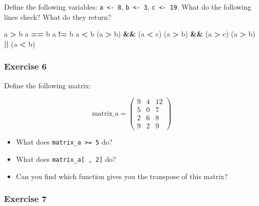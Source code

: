 \documentclass[
]{article}
\newenvironment{Shaded}{\begin{snugshade}}{\end{snugshade}}
\newcommand{\NormalTok}[1]{#1}
\newcommand{\OperatorTok}[1]{\textcolor[rgb]{0.81,0.36,0.00}{\textbf{#1}}}
\newcommand{\StringTok}[1]{\textcolor[rgb]{0.31,0.60,0.02}{#1}}
\providecommand{\tightlist}{%
  \setlength{\itemsep}{0pt}\setlength{\parskip}{0pt}}
\begin{document}
Define the following variables: \texttt{a\ \textless{}-\ 8}, \texttt{b\ \textless{}-\ 3}, \texttt{c\ \textless{}-\ 19}. What do the following lines check?
What do they return?

\begin{Shaded}
\begin{Highlighting}[]
\NormalTok{a }\OperatorTok{\textgreater{}}\StringTok{ }\NormalTok{b}
\NormalTok{a }\OperatorTok{==}\StringTok{ }\NormalTok{b}
\NormalTok{a }\OperatorTok{!=}\StringTok{ }\NormalTok{b}
\NormalTok{a }\OperatorTok{\textless{}}\StringTok{ }\NormalTok{b}
\NormalTok{(a }\OperatorTok{\textgreater{}}\StringTok{ }\NormalTok{b) }\OperatorTok{\&\&}\StringTok{ }\NormalTok{(a }\OperatorTok{\textless{}}\StringTok{ }\NormalTok{c)}
\NormalTok{(a }\OperatorTok{\textgreater{}}\StringTok{ }\NormalTok{b) }\OperatorTok{\&\&}\StringTok{ }\NormalTok{(a }\OperatorTok{\textgreater{}}\StringTok{ }\NormalTok{c)}
\NormalTok{(a }\OperatorTok{\textgreater{}}\StringTok{ }\NormalTok{b) }\OperatorTok{||}\StringTok{ }\NormalTok{(a }\OperatorTok{\textless{}}\StringTok{ }\NormalTok{b)}
\end{Highlighting}
\end{Shaded}

\hypertarget{exercise-6}{%
\subsubsection*{Exercise 6}\label{exercise-6}}

Define the following matrix:

\[
\text{matrix_a} = \left(
\begin{array}{ccc}
 9 & 4 & 12 \\
 5 & 0 & 7 \\
 2 & 6 & 8 \\
 9 & 2 & 9
\end{array} \right)
\]

\begin{itemize}
\tightlist
\item
  What does \texttt{matrix\_a\ \textgreater{}=\ 5} do?
\item
  What does \texttt{matrix\_a{[}\ ,\ 2{]}} do?
\item
  Can you find which function gives you the transpose of this matrix?
\end{itemize}

\hypertarget{exercise-7}{%
\subsubsection*{Exercise 7}\label{exercise-7}}
\end{document}
